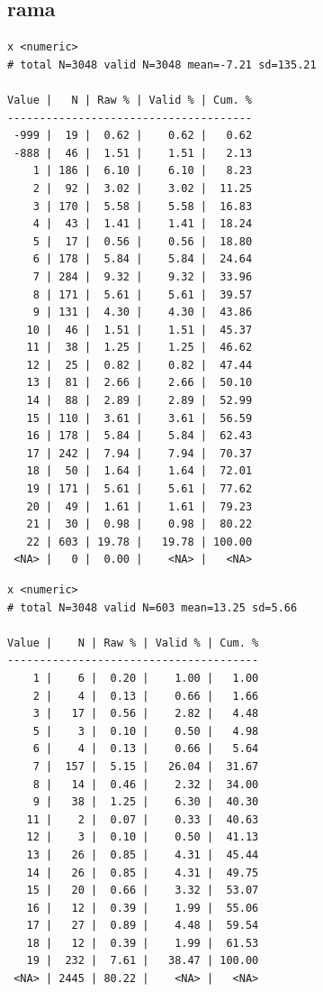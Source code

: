\documentclass[
  letterpaper,
  DIV=11,
  numbers=noendperiod]{scrreprt}
\newenvironment{Shaded}{\begin{snugshade}}{\end{snugshade}}
\newcommand{\CommentTok}[1]{\textcolor[rgb]{0.37,0.37,0.37}{#1}}
\newcommand{\FunctionTok}[1]{\textcolor[rgb]{0.28,0.35,0.67}{#1}}
\newcommand{\NormalTok}[1]{\textcolor[rgb]{0.00,0.23,0.31}{#1}}
\newcommand{\SpecialCharTok}[1]{\textcolor[rgb]{0.37,0.37,0.37}{#1}}
\begin{document}
\hypertarget{rama}{%
\subsection{rama}\label{rama}}

\begin{Shaded}
\end{Shaded}

\begin{verbatim}
x <numeric> 
# total N=3048 valid N=3048 mean=-7.21 sd=135.21

Value |   N | Raw % | Valid % | Cum. %
--------------------------------------
 -999 |  19 |  0.62 |    0.62 |   0.62
 -888 |  46 |  1.51 |    1.51 |   2.13
    1 | 186 |  6.10 |    6.10 |   8.23
    2 |  92 |  3.02 |    3.02 |  11.25
    3 | 170 |  5.58 |    5.58 |  16.83
    4 |  43 |  1.41 |    1.41 |  18.24
    5 |  17 |  0.56 |    0.56 |  18.80
    6 | 178 |  5.84 |    5.84 |  24.64
    7 | 284 |  9.32 |    9.32 |  33.96
    8 | 171 |  5.61 |    5.61 |  39.57
    9 | 131 |  4.30 |    4.30 |  43.86
   10 |  46 |  1.51 |    1.51 |  45.37
   11 |  38 |  1.25 |    1.25 |  46.62
   12 |  25 |  0.82 |    0.82 |  47.44
   13 |  81 |  2.66 |    2.66 |  50.10
   14 |  88 |  2.89 |    2.89 |  52.99
   15 | 110 |  3.61 |    3.61 |  56.59
   16 | 178 |  5.84 |    5.84 |  62.43
   17 | 242 |  7.94 |    7.94 |  70.37
   18 |  50 |  1.64 |    1.64 |  72.01
   19 | 171 |  5.61 |    5.61 |  77.62
   20 |  49 |  1.61 |    1.61 |  79.23
   21 |  30 |  0.98 |    0.98 |  80.22
   22 | 603 | 19.78 |   19.78 | 100.00
 <NA> |   0 |  0.00 |    <NA> |   <NA>
\end{verbatim}

\begin{Shaded}
\end{Shaded}

\begin{verbatim}
x <numeric> 
# total N=3048 valid N=603 mean=13.25 sd=5.66

Value |    N | Raw % | Valid % | Cum. %
---------------------------------------
    1 |    6 |  0.20 |    1.00 |   1.00
    2 |    4 |  0.13 |    0.66 |   1.66
    3 |   17 |  0.56 |    2.82 |   4.48
    5 |    3 |  0.10 |    0.50 |   4.98
    6 |    4 |  0.13 |    0.66 |   5.64
    7 |  157 |  5.15 |   26.04 |  31.67
    8 |   14 |  0.46 |    2.32 |  34.00
    9 |   38 |  1.25 |    6.30 |  40.30
   11 |    2 |  0.07 |    0.33 |  40.63
   12 |    3 |  0.10 |    0.50 |  41.13
   13 |   26 |  0.85 |    4.31 |  45.44
   14 |   26 |  0.85 |    4.31 |  49.75
   15 |   20 |  0.66 |    3.32 |  53.07
   16 |   12 |  0.39 |    1.99 |  55.06
   17 |   27 |  0.89 |    4.48 |  59.54
   18 |   12 |  0.39 |    1.99 |  61.53
   19 |  232 |  7.61 |   38.47 | 100.00
 <NA> | 2445 | 80.22 |    <NA> |   <NA>
\end{verbatim}
\end{document}
